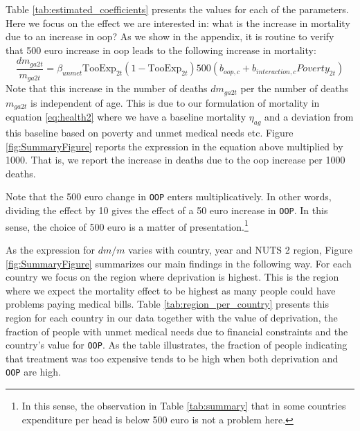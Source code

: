 \documentclass[a4paper,12pt]{article}
\begin{document}
Table \ref{tab:estimated_coefficients} presents the values for each of the parameters. Here we focus on the effect we are interested in: what is the increase in mortality due to an increase in oop? As we show in the appendix, it is routine to verify that 500 euro increase in oop leads to the following increase in mortality:
\begin{equation}
\label{eq:change_mortality}
\frac{dm_{ga2t}}{m_{ga2t}} = \beta_{unmet} \text{TooExp}_{2t}(1-\text{TooExp}_{2t}) 500 (b_{oop,c}+b_{interaction,c} Poverty_{2t})
\end{equation}
Note that this increase in the number of deaths \(dm_{ga2t}\) per the number of deaths \(m_{ga2t}\) is independent of age. This is due to our formulation of mortality in equation \eqref{eq:health2} where we have a baseline mortality \(\eta_{ag}\) and a deviation from this baseline based on poverty and unmet medical needs etc. Figure \ref{fig:SummaryFigure} reports the expression in the equation above multiplied by 1000. That is, we report the increase in deaths due to the oop increase per 1000 deaths.

Note that the 500 euro change in \texttt{OOP} enters multiplicatively. In other words, dividing the effect by 10 gives the effect of a 50 euro increase in \texttt{OOP}. In this sense, the choice of 500 euro is a matter of presentation.\footnote{In this sense, the observation in Table \ref{tab:summary} that in some countries expenditure per head is below 500 euro is not a problem here.}

As the expression for \(dm/m\) varies with country, year and NUTS 2 region, Figure \ref{fig:SummaryFigure} summarizes our main findings in the following way. For each country we focus on the region where deprivation is highest. This is the region where we expect the mortality effect to be highest as many people could have problems paying medical bills. Table \ref{tab:region_per_country} presents this region for each country in our data together with the value of deprivation, the fraction of people with unmet medical needs due to financial constraints and the country's value for \texttt{OOP}. As the table illustrates, the fraction of people indicating that treatment was too expensive tends to be high when both deprivation and \texttt{OOP} are high.
\end{document}
